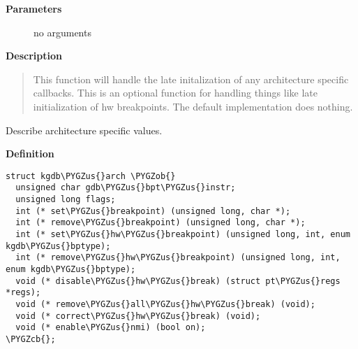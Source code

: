 \documentclass[a4paper,8pt,english]{sphinxmanual}
\def\PYGZus{\char`\_}
\def\PYGZob{\char`\{}
\def\PYGZcb{\char`\}}
\begin{document}
\textbf{Parameters}
\begin{description}
\item[{}] \leavevmode
no arguments

\end{description}

\textbf{Description}
\begin{quote}

This function will handle the late initalization of any
architecture specific callbacks.  This is an optional function for
handling things like late initialization of hw breakpoints.  The
default implementation does nothing.
\end{quote}

\begin{fulllineitems}
\label{dev-tools/kgdb:c.kgdb_arch}
Describe architecture specific values.

\end{fulllineitems}


\textbf{Definition}

\begin{Verbatim}[commandchars=\\\{\}]
struct kgdb\PYGZus{}arch \PYGZob{}
  unsigned char gdb\PYGZus{}bpt\PYGZus{}instr;
  unsigned long flags;
  int (* set\PYGZus{}breakpoint) (unsigned long, char *);
  int (* remove\PYGZus{}breakpoint) (unsigned long, char *);
  int (* set\PYGZus{}hw\PYGZus{}breakpoint) (unsigned long, int, enum kgdb\PYGZus{}bptype);
  int (* remove\PYGZus{}hw\PYGZus{}breakpoint) (unsigned long, int, enum kgdb\PYGZus{}bptype);
  void (* disable\PYGZus{}hw\PYGZus{}break) (struct pt\PYGZus{}regs *regs);
  void (* remove\PYGZus{}all\PYGZus{}hw\PYGZus{}break) (void);
  void (* correct\PYGZus{}hw\PYGZus{}break) (void);
  void (* enable\PYGZus{}nmi) (bool on);
\PYGZcb{};
\end{Verbatim}
\end{document}
